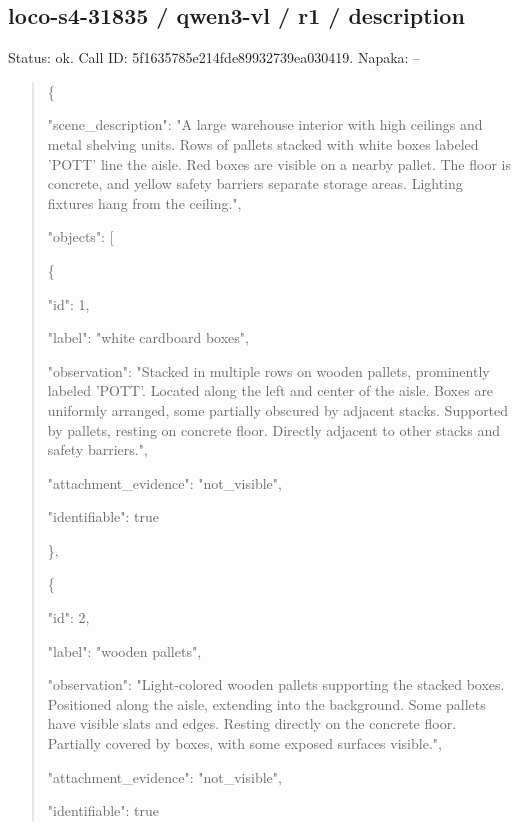 \documentclass[10pt,a4paper]{article}
\begin{document}
\subsection*{loco-s4-31835 / qwen3-vl / r1 / description}
Status: ok. Call ID: 5f1635785e214fde89932739ea030419. Napaka: --
\begin{quote}\footnotesize
\{\par
  "scene\_description":\allowbreak{} "A large warehouse interior with high ceilings and metal shelving units. Rows of pallets stacked with white boxes labeled 'POTT' line the aisle. Red boxes are visible on a nearby pallet. The floor is concrete,\allowbreak{} and yellow safety barriers separate storage areas. Lighting fixtures hang from the ceiling.",\allowbreak{}\par
  "objects":\allowbreak{} [\par
    \{\par
      "id":\allowbreak{} 1,\allowbreak{}\par
      "label":\allowbreak{} "white cardboard boxes",\allowbreak{}\par
      "observation":\allowbreak{} "Stacked in multiple rows on wooden pallets,\allowbreak{} prominently labeled 'POTT'. Located along the left and center of the aisle. Boxes are uniformly arranged,\allowbreak{} some partially obscured by adjacent stacks. Supported by pallets,\allowbreak{} resting on concrete floor. Directly adjacent to other stacks and safety barriers.",\allowbreak{}\par
      "attachment\_evidence":\allowbreak{} "not\_visible",\allowbreak{}\par
      "identifiable":\allowbreak{} true\par
    \},\allowbreak{}\par
    \{\par
      "id":\allowbreak{} 2,\allowbreak{}\par
      "label":\allowbreak{} "wooden pallets",\allowbreak{}\par
      "observation":\allowbreak{} "Light-colored wooden pallets supporting the stacked boxes. Positioned along the aisle,\allowbreak{} extending into the background. Some pallets have visible slats and edges. Resting directly on the concrete floor. Partially covered by boxes,\allowbreak{} with some exposed surfaces visible.",\allowbreak{}\par
      "attachment\_evidence":\allowbreak{} "not\_visible",\allowbreak{}\par
      "identifiable":\allowbreak{} true\par

\end{quote}
\end{document}
